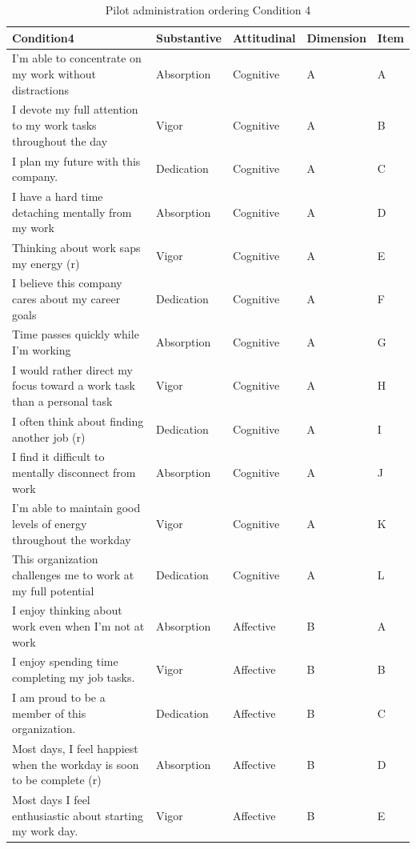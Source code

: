 \documentclass[
]{book}
\begin{document}
\begin{table}

\caption{\label{tab:cond4}Pilot administration ordering Condition 4}
\centering
\begin{tabular}[t]{l|l|l|l|l}
\hline
Condition4 & Substantive & Attitudinal & Dimension & Item\\
\hline
I’m able to concentrate on my work without distractions & Absorption & Cognitive & A & A\\
\hline
I devote my full attention to my work tasks throughout the day & Vigor & Cognitive & A & B\\
\hline
I plan my future with this company. & Dedication & Cognitive & A & C\\
\hline
I have a hard time detaching mentally from my work & Absorption & Cognitive & A & D\\
\hline
Thinking about work saps my energy (r) & Vigor & Cognitive & A & E\\
\hline
I believe this company cares about my career goals & Dedication & Cognitive & A & F\\
\hline
Time passes quickly while I’m working & Absorption & Cognitive & A & G\\
\hline
I would rather direct my focus toward a work task than a personal task & Vigor & Cognitive & A & H\\
\hline
I often think about finding another job (r) & Dedication & Cognitive & A & I\\
\hline
I find it difficult to mentally disconnect from work & Absorption & Cognitive & A & J\\
\hline
I’m able to maintain good levels of energy throughout the workday & Vigor & Cognitive & A & K\\
\hline
This organization challenges me to work at my full potential & Dedication & Cognitive & A & L\\
\hline
I enjoy thinking about work even when I’m not at work & Absorption & Affective & B & A\\
\hline
I enjoy spending time completing my job tasks. & Vigor & Affective & B & B\\
\hline
I am proud to be a member of this organization. & Dedication & Affective & B & C\\
\hline
Most days, I feel happiest when the workday is soon to be complete (r) & Absorption & Affective & B & D\\
\hline
Most days I feel enthusiastic about starting my work day. & Vigor & Affective & B & E\\

\end{tabular}
\end{table}
\end{document}
